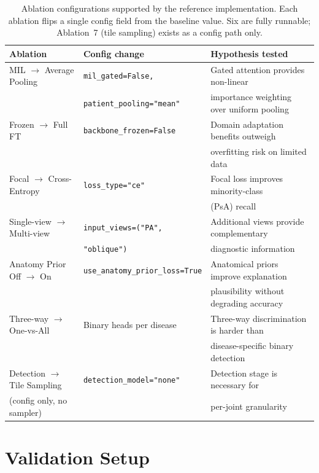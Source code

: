 \documentclass{article}
\begin{document}
\begin{table}[h]
\centering
\caption{Ablation configurations supported by the reference implementation. Each ablation flips a single config field from the baseline value. Six are fully runnable; Ablation~7 (tile sampling) exists as a config path only.}
\label{tab:ablations}
\begin{tabular}{@{}lll@{}}
\toprule
\textbf{Ablation} & \textbf{Config change} & \textbf{Hypothesis tested} \\
\midrule
MIL $\rightarrow$ Average Pooling & \texttt{mil\_gated=False,} & Gated attention provides non-linear \\
 & \texttt{patient\_pooling="mean"} & importance weighting over uniform pooling \\
\midrule
Frozen $\rightarrow$ Full FT & \texttt{backbone\_frozen=False} & Domain adaptation benefits outweigh \\
 &  & overfitting risk on limited data \\
\midrule
Focal $\rightarrow$ Cross-Entropy & \texttt{loss\_type="ce"} & Focal loss improves minority-class \\
 &  & (PsA) recall \\
\midrule
Single-view $\rightarrow$ Multi-view & \texttt{input\_views=("PA",} & Additional views provide complementary \\
 & \texttt{"oblique")} & diagnostic information \\
\midrule
Anatomy Prior Off $\rightarrow$ On & \texttt{use\_anatomy\_prior\_loss=True} & Anatomical priors improve explanation \\
 &  & plausibility without degrading accuracy \\
\midrule
Three-way $\rightarrow$ One-vs-All & Binary heads per disease & Three-way discrimination is harder than \\
 &  & disease-specific binary detection \\
\midrule
Detection $\rightarrow$ Tile Sampling & \texttt{detection\_model="none"} & Detection stage is necessary for \\
 (config only, no sampler) &  & per-joint granularity \\
\bottomrule
\end{tabular}
\end{table}

\section{Validation Setup}
\label{sec:setup}
\end{document}
